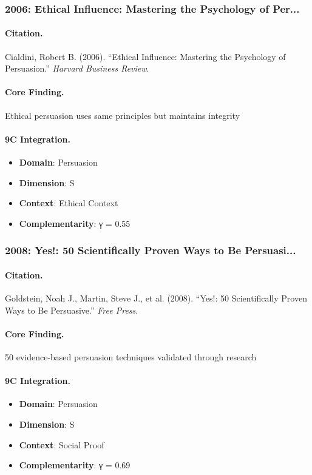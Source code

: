 \subsubsection{2006: Ethical Influence: Mastering the Psychology of Per...}

\paragraph{Citation.}
Cialdini, Robert B. (2006). ``Ethical Influence: Mastering the Psychology of Persuasion.''
\textit{Harvard Business Review}.

\paragraph{Core Finding.}
Ethical persuasion uses same principles but maintains integrity

\paragraph{9C Integration.}
\begin{itemize}[nosep]
  \item \textbf{Domain}: Persuasion
  \item \textbf{Dimension}: S
  \item \textbf{Context}: Ethical Context
  \item \textbf{Complementarity}: γ = 0.55
\end{itemize}

\subsubsection{2008: Yes!: 50 Scientifically Proven Ways to Be Persuasi...}

\paragraph{Citation.}
Goldstein, Noah J., Martin, Steve J., et al. (2008). ``Yes!: 50 Scientifically Proven Ways to Be Persuasive.''
\textit{Free Press}.

\paragraph{Core Finding.}
50 evidence-based persuasion techniques validated through research

\paragraph{9C Integration.}
\begin{itemize}[nosep]
  \item \textbf{Domain}: Persuasion
  \item \textbf{Dimension}: S
  \item \textbf{Context}: Social Proof
  \item \textbf{Complementarity}: γ = 0.69
\end{itemize}

